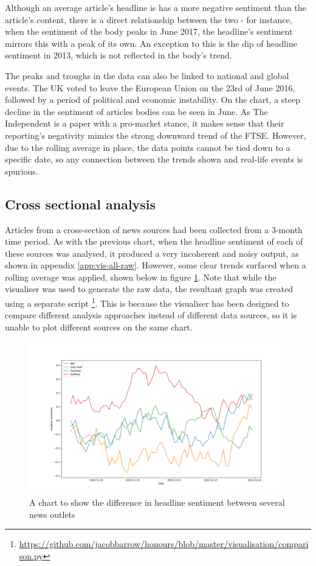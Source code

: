 Although an average article's headline is has a more negative sentiment than the article's content, there is a direct relationship between the two - for instance, when the sentiment of the body peaks in June 2017, the headline's sentiment mirrors this with a peak of its own. An exception to this is the dip of headline sentiment in 2013, which is not reflected in the body's trend. 

The peaks and troughs in the data can also be linked to national and global events. The UK voted to leave the European Union on the 23rd of June 2016, followed by a period of political and economic instability. On the chart, a steep decline in the sentiment of articles bodies can be seen in June. As The Independent is a paper with a pro-market stance, it makes sense that their reporting's negativity mimics the strong downward trend of the FTSE. However, due to the rolling average in place, the data points cannot be tied down to a specific date, so any connection between the trends shown and real-life events is spurious.

\subsection{Cross sectional analysis}

Articles from a cross-section of news sources had been collected from a 3-month time period. As with the previous chart, when the headline sentiment of each of these sources was analysed, it produced a very incoherent and noisy output, as shown in appendix \ref{app:vis-all-raw}. However, some clear trends surfaced when a rolling average was applied, shown below in figure \ref{fig:smooth-all}. Note that while the visualiser was used to generate the raw data, the resultant graph was created using a separate script \footnote{\url{https://github.com/jacobbarrow/honours/blob/master/visualisation/comparison.py}}. This is because the visualiser has been designed to compare different analysis approaches instead of different data sources, so it is unable to plot different sources on the same chart.

\begin{figure}[h]
  \includegraphics[width=\linewidth]{../visualisation/comparison-smooth.png}
  \caption{A chart to show the difference in headline sentiment between several news outlets}
  \label{fig:smooth-all}
\end{figure}

